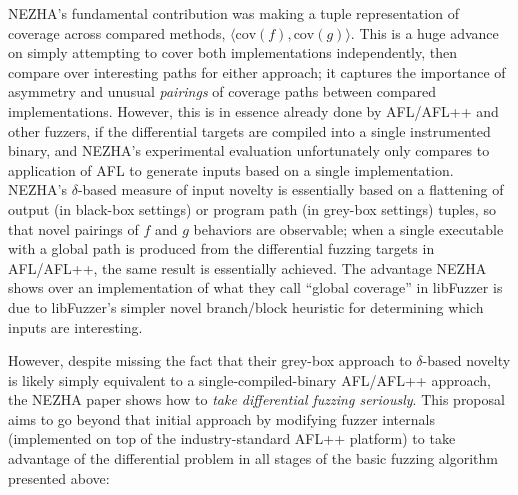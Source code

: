 NEZHA's fundamental contribution was making a tuple
representation of coverage across compared methods,
$\langle \text{cov}(f), \text{cov}(g) \rangle$. This is a huge advance on
simply attempting to cover both implementations independently, then
compare over interesting paths for either approach; it captures the
importance of asymmetry and unusual \emph{pairings} of coverage paths
between compared implementations.  However, this is in essence already
done by AFL/AFL++ and other fuzzers, if the differential targets are
compiled into a single instrumented binary, and NEZHA's experimental
evaluation unfortunately only compares to
application of AFL to generate inputs based on a single
implementation.  NEZHA's $\delta$-based measure of input novelty is essentially based on a flattening
of output (in black-box settings) or program path (in grey-box
settings) tuples, so that novel pairings of $f$ and $g$ behaviors are
observable; when a single executable with a global path is produced
from the differential fuzzing targets in AFL/AFL++, the same result is
essentially achieved.  The advantage NEZHA shows over an
implementation of what they call ``global coverage'' in  libFuzzer is due
to libFuzzer's simpler novel branch/block heuristic for determining
which inputs are interesting.

However, despite missing the fact that their grey-box approach to
$\delta$-based novelty is likely simply equivalent to a
single-compiled-binary AFL/AFL++ approach, the NEZHA paper shows how
to \emph{take differential fuzzing seriously}.  This proposal aims to
go beyond that initial approach by modifying fuzzer internals (implemented on
top of the industry-standard AFL++ platform) to take advantage of the
differential problem in all stages of the basic fuzzing algorithm
presented above:


